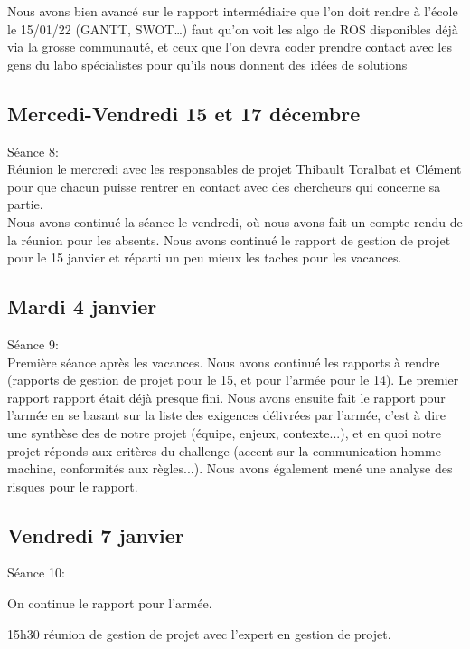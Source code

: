 \documentclass[11pt]{article}
\begin{document}
Nous avons bien avancé sur le rapport intermédiaire que l’on doit rendre à l’école le 15/01/22 (GANTT, SWOT…)
faut qu’on voit les algo de ROS disponibles déjà via la grosse communauté, et ceux que l’on devra coder
prendre contact avec les gens du labo spécialistes pour qu’ils nous donnent des idées de solutions


\subsection{Mercedi-Vendredi 15 et 17 décembre}

Séance 8: \\

Réunion le mercredi avec les responsables de projet Thibault Toralbat et Clément pour que chacun puisse rentrer en contact avec des chercheurs qui concerne sa partie.\\
Nous avons continué la séance le vendredi, où nous avons fait un compte rendu de la réunion pour les absents. Nous avons continué le rapport de gestion de projet pour le 15 janvier et réparti un peu mieux les taches pour les vacances.


\subsection{Mardi 4 janvier}

Séance 9: \\

Première séance après les vacances. Nous avons continué les rapports à rendre (rapports de gestion de projet pour le 15, et pour l'armée pour le 14). Le premier rapport rapport était déjà presque fini. Nous avons ensuite fait le rapport pour l'armée en se basant sur la liste des exigences délivrées par l'armée, c'est à dire une synthèse des de notre projet (équipe, enjeux, contexte...), et en quoi notre projet réponds aux critères du challenge (accent sur la communication homme-machine, conformités aux règles...). Nous avons également mené une analyse des risques pour le rapport.  


\subsection{Vendredi 7 janvier}

Séance 10:

On continue le rapport pour l'armée. 

15h30 réunion de gestion de projet avec l'expert en gestion de projet.
\end{document}
